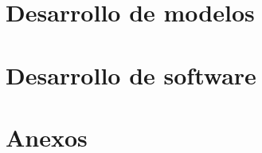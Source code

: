 \documentclass{article}
\begin{document}
\clearpage\hbox{}\thispagestyle{empty}\newpage
\clearpage\hbox{}\thispagestyle{empty}\newpage



\clearpage\hbox{}\thispagestyle{empty}\newpage



\clearpage\hbox{}\thispagestyle{empty}\newpage



\clearpage\hbox{}\thispagestyle{empty}\newpage



\clearpage\hbox{}\thispagestyle{empty}\newpage



\clearpage\hbox{}\thispagestyle{empty}\newpage
\clearpage\hbox{}\thispagestyle{empty}\newpage

\newpage
\tableofcontents

\newpage
\listoffigures

\newpage
\listoftables

\newpage



\newpage


\newpage


\newpage
\part{Desarrollo de modelos}

\newpage


\newpage


\newpage


\newpage
\part{Desarrollo de software}
\newpage


\newpage


\newpage


\newpage
\part{Anexos}

\appendix

\newpage


\newpage


\newpage


\newpage

\end{document}
